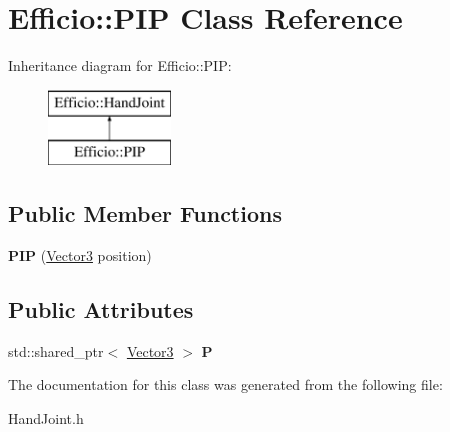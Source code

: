 \hypertarget{class_efficio_1_1_p_i_p}{}\section{Efficio\+:\+:P\+IP Class Reference}
\label{class_efficio_1_1_p_i_p}
Inheritance diagram for Efficio\+:\+:P\+IP\+:\begin{figure}[H]
\begin{center}
\leavevmode
\includegraphics[height=2.000000cm]{class_efficio_1_1_p_i_p}
\end{center}
\end{figure}
\subsection*{Public Member Functions}
\begin{DoxyCompactItemize}
\item 
{\bfseries P\+IP} (\hyperlink{class_efficio_1_1_vector3}{Vector3} position)\hypertarget{class_efficio_1_1_p_i_p_adbeea34fdcf9cd9941853c90d0b8c308}{}\label{class_efficio_1_1_p_i_p_adbeea34fdcf9cd9941853c90d0b8c308}

\end{DoxyCompactItemize}
\subsection*{Public Attributes}
\begin{DoxyCompactItemize}
\item 
std\+::shared\+\_\+ptr$<$ \hyperlink{class_efficio_1_1_vector3}{Vector3} $>$ {\bfseries P}\hypertarget{class_efficio_1_1_p_i_p_aa171fb1605021987995255914432ecfe}{}\label{class_efficio_1_1_p_i_p_aa171fb1605021987995255914432ecfe}

\end{DoxyCompactItemize}


The documentation for this class was generated from the following file\+:\begin{DoxyCompactItemize}
\item 
Hand\+Joint.\+h\end{DoxyCompactItemize}
